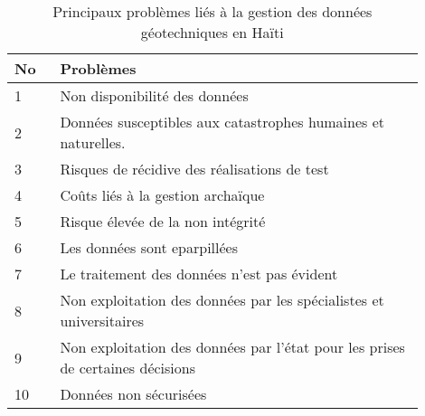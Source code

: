 \par    
\begin{table}
        \centering
        \begin{tabular}{|p{0.10\linewidth}|p{0.80\linewidth}|}
        \hline
                \textbf{No} & \textbf{Problèmes} \\
                \hline
                    1&
                    Non disponibilité des données
                         \\
                \hline
                2&
                Données susceptibles aux catastrophes humaines et naturelles.
                    \\
                \hline
                3&
                Risques de récidive des réalisations de test
                    \\
                \hline
                4&
                Coûts liés à la gestion archaïque
                    \\
                \hline
                5&
                Risque élevée de la non intégrité
                        \\
                \hline
                6&
                Les données sont eparpillées
                        \\
                \hline
                7&
                Le traitement des données n'est pas évident
                        \\
                \hline
                8&
                Non exploitation des données par les spécialistes et universitaires
                        \\
                \hline 
                9&
                Non exploitation des données par l'état pour les prises de certaines décisions
                        \\
                \hline 
                10&
                Données non sécurisées
                        \\
                \hline 
        \end{tabular}
        \caption{Principaux problèmes liés à la gestion des données géotechniques en Haïti} \label{tab:problemes}
\end{table}
\par